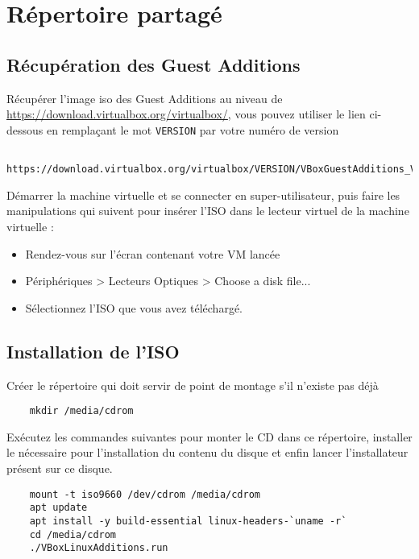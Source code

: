 \chapter{Répertoire partagé}

\section{Récupération des Guest Additions}

Récupérer l'image iso des Guest Additions au niveau de \href{https://download.virtualbox.org/virtualbox/}{https://download.virtualbox.org/virtualbox/}, vous pouvez utiliser le lien ci-dessous en remplaçant le mot \texttt{VERSION} par votre numéro de version

\begin{lstlisting}
	https://download.virtualbox.org/virtualbox/VERSION/VBoxGuestAdditions_VERSION.iso
\end{lstlisting}

Démarrer la machine virtuelle et se connecter en super-utilisateur, puis faire les manipulations qui suivent pour insérer l'ISO dans le lecteur virtuel de la machine virtuelle :
\begin{itemize}
	\item Rendez-vous sur l'écran contenant votre VM lancée
	\item Périphériques > Lecteurs Optiques > Choose a disk file...
	\item Sélectionnez l'ISO que vous avez téléchargé.
\end{itemize}

\section{Installation de l'ISO}

Créer le répertoire qui doit servir de point de montage s'il n'existe pas déjà

\begin{lstlisting}
	mkdir /media/cdrom
\end{lstlisting}

Exécutez les commandes suivantes pour monter le CD dans ce répertoire, installer le nécessaire pour l'installation du contenu du disque et enfin lancer l'installateur présent sur ce disque.

\begin{lstlisting}
	mount -t iso9660 /dev/cdrom /media/cdrom
	apt update
	apt install -y build-essential linux-headers-`uname -r`
	cd /media/cdrom
	./VBoxLinuxAdditions.run
\end{lstlisting}

